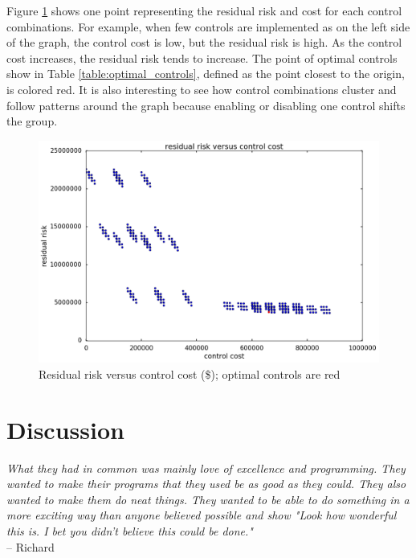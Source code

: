 \documentclass{article}
\begin{document}
Figure \ref{figure:riskvscost} shows one point representing the residual risk and cost for each control combinations. For example, when few controls are implemented as on the left side of the graph, the control cost is low, but the residual risk is high. As the control cost increases, the residual risk tends to increase. The point of optimal controls show in Table \ref{table:optimal_controls}, defined as the point closest to the origin, is colored red. It is also interesting to see how control combinations cluster and follow patterns around the graph because enabling or disabling one control shifts the group.
 
\begin{figure}[h] \centering
    \includegraphics[width=\textwidth]{images/riskvscost.png}
    \caption{Residual risk versus control cost (\$); optimal controls are red}
    \label{figure:riskvscost}
\end{figure}


\newpage
\section{Discussion}

\begin{mdframed}
    \emph{What they had in common was mainly love of excellence and programming. They wanted to make their programs that they used be as good as they could. They also wanted to make them do neat things. They wanted to be able to do something in a more exciting way than anyone believed possible and show "Look how wonderful this is. I bet you didn't believe this could be done."} \\ -- Richard \cite{stallman_hackers_1985}
\end{mdframed}
\end{document}
